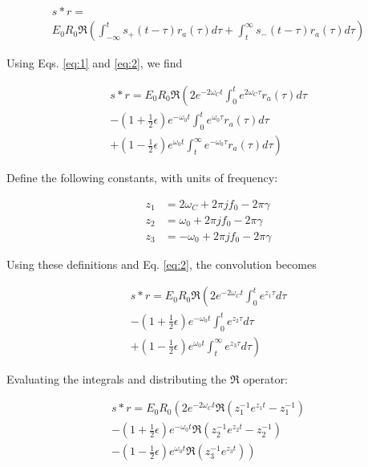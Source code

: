 \documentclass[amsmath,amssymb,aps,prd,10pt,twocolumn,showkeys]{revtex4}
\begin{document}
\begin{multline}
s * r = \\ E_0 R_0 \Re \left( \int_{-\infty}^t s_+(t-\tau) r_a(\tau) d\tau + \int_t^{\infty} s_-(t-\tau) r_a(\tau) d\tau\right)
\end{multline}

Using Eqs. \ref{eq:1} and \ref{eq:2}, we find

\begin{multline}
s * r = E_0 R_0 \Re \left( 2e^{-2\omega_C t}\int_0^t e^{2\omega_C \tau}r_a(\tau)d\tau \right. \\ - \left. \left(1+\frac{1}{2}\epsilon\right)e^{-\omega_0 t}\int_0^{t} e^{\omega_0 \tau} r_a(\tau)d\tau \right. \\ + \left. \left(1-\frac{1}{2}\epsilon\right)e^{\omega_0 t}\int_t^{\infty} e^{-\omega_0 \tau} r_a(\tau) d\tau \right)
\end{multline}

Define the following constants, with units of frequency:

\begin{align}
z_1 &= 2\omega_C + 2\pi jf_0 -2\pi\gamma \\
z_2 &= \omega_0 + 2\pi jf_0 -2\pi\gamma \\
z_3 &= -\omega_0 + 2\pi jf_0 -2\pi\gamma
\end{align}

Using these definitions and Eq. \ref{eq:2}, the convolution becomes

\begin{multline}
s * r = E_0 R_0 \Re \left( 2e^{-2\omega_C t}\int_0^t e^{z_1 \tau}d\tau \right. \\ - \left. \left(1+\frac{1}{2}\epsilon\right)e^{-\omega_0 t}\int_0^{t} e^{z_2 \tau}d\tau\right. \\ + \left. \left(1-\frac{1}{2}\epsilon\right)e^{\omega_0 t}\int_t^{\infty} e^{z_3 \tau}d\tau \right)
\end{multline}

Evaluating the integrals and distributing the $\Re$ operator:

\begin{multline}
s * r = E_0 R_0 \left( 2 e^{-2\omega_C t} \Re\left( z_1^{-1} e^{z_1 t} - z  _1^{-1}\right) \right. \\ \left. - \left(1+\frac{1}{2}\epsilon\right)e^{-\omega_0 t} \Re\left( z_2^{-1} e^{z_2 t} - z_2^{-1}\right) \right. \\ \left. - \left(1-\frac{1}{2}\epsilon\right)e^{\omega_0 t} \Re\left(z_3^{-1} e^{z_3 t}\right) \right)
\end{multline}
\end{document}
